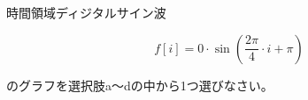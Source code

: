 時間領域ディジタルサイン波 

\[
f[i] = 0 \cdot \sin \left ( \frac{2 \pi}{4}  \cdot i + \pi \right )
\]

\noindent のグラフを選択肢a〜dの中から1つ選びなさい。
